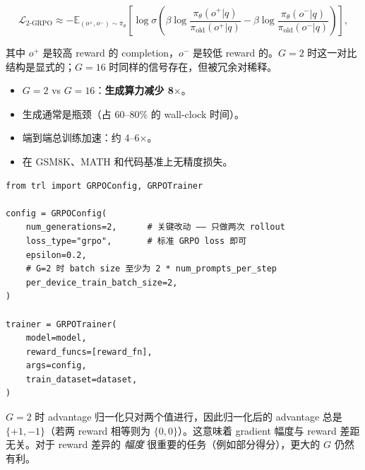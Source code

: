 \[
\mathcal{L}_{\text{2-GRPO}} \approx
  -\mathbb{E}_{(o^+, o^-) \sim \pi_\theta}\!\left[
    \log \sigma\!\left(
      \beta \log \frac{\pi_\theta(o^+|q)}{\pi_{\text{old}}(o^+|q)}
      - \beta \log \frac{\pi_\theta(o^-|q)}{\pi_{\text{old}}(o^-|q)}
    \right)
  \right],
\]

其中 $o^+$ 是较高 reward 的 completion，$o^-$ 是较低 reward 的。$G=2$ 时这一对比结构是显式的；$G=16$ 时同样的信号存在，但被冗余对稀释。

\begin{keybox}
\begin{itemize}
  \item $G=2$ vs $G=16$：\textbf{生成算力减少 8$\times$}。
  \item 生成通常是瓶颈（占 60--80\% 的 wall-clock 时间）。
  \item 端到端总训练加速：约 4--6$\times$。
  \item 在 GSM8K、MATH 和代码基准上无精度损失。
\end{itemize}
\end{keybox}

\begin{examplebox}
\begin{lstlisting}[style=pythonstyle]
from trl import GRPOConfig, GRPOTrainer

config = GRPOConfig(
    num_generations=2,      # 关键改动 —— 只做两次 rollout
    loss_type="grpo",       # 标准 GRPO loss 即可
    epsilon=0.2,
    # G=2 时 batch size 至少为 2 * num_prompts_per_step
    per_device_train_batch_size=2,
)

trainer = GRPOTrainer(
    model=model,
    reward_funcs=[reward_fn],
    args=config,
    train_dataset=dataset,
)
\end{lstlisting}
\end{examplebox}

\begin{warningbox}[2-GRPO 的注意事项]
$G=2$ 时 advantage 归一化只对两个值进行，因此归一化后的 advantage 总是 $\{+1, -1\}$（若两 reward 相等则为 $\{0, 0\}$）。这意味着 gradient 幅度与 reward 差距无关。对于 reward 差异的 \emph{幅度} 很重要的任务（例如部分得分），更大的 $G$ 仍然有利。
\end{warningbox}

